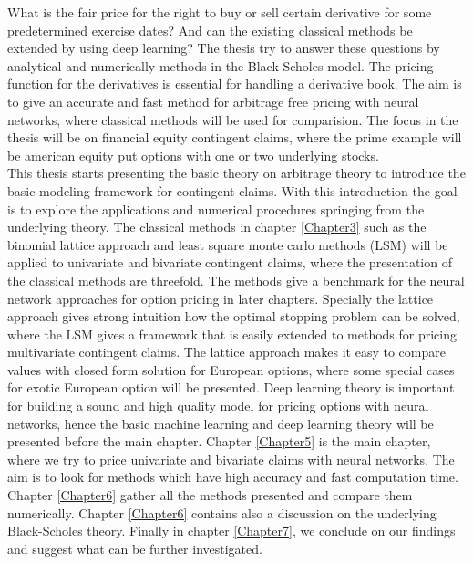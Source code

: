 What is the fair price for the right to buy or sell certain derivative for some predetermined exercise dates? And can the existing classical methods be extended by using deep learning? The thesis try to answer these questions by analytical and numerically methods in the Black-Scholes model. The pricing function for the derivatives is essential for handling a derivative book. The aim is to give an accurate and fast method for arbitrage free pricing with neural networks, where classical methods will be used for comparision. The focus in the thesis will be on financial equity contingent claims, where the prime example will be american equity put options with one or two underlying stocks.\\

This thesis starts presenting the basic theory on arbitrage theory to introduce the basic modeling framework for contingent claims. With this introduction the goal is to explore the applications and numerical procedures springing from the underlying theory. The classical methods in chapter \ref{Chapter3} such as the binomial lattice approach and least square monte carlo methods (LSM) will be applied to univariate and bivariate contingent claims, where the presentation of the classical methods are threefold. The methods give a benchmark for the neural network approaches for option pricing in later chapters. Specially the lattice approach gives strong intuition how the optimal stopping problem can be solved, where the LSM gives a framework that is easily extended to methods for pricing multivariate contingent claims. The lattice approach makes it easy to compare values with closed form solution for European options, where some special cases for exotic European option will be presented. Deep learning theory is important for building a sound and high quality model for pricing options with neural networks, hence the basic machine learning and deep learning theory will be presented before the main chapter. Chapter \ref{Chapter5} is the main chapter, where we try to price univariate and bivariate claims with neural networks. The aim is to look for methods which have high accuracy and fast computation time. Chapter \ref{Chapter6} gather all the methods presented and compare them numerically. Chapter \ref{Chapter6} contains also a discussion on the underlying Black-Scholes theory. Finally in chapter \ref{Chapter7}, we conclude on our findings and suggest what can be further investigated.


